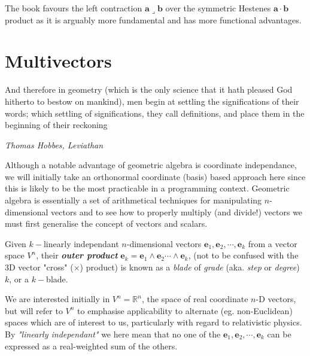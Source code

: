 \documentclass[a4paper]{book}
\numberwithin{equation}{chapter}
\begin{document}
   
\vspace{\baselineskip}

The book favours the left contraction $\mathbf{a}\lrcorner\mathbf{b}$
over the symmetric Hestenes $\mathbf{a}\cdot\mathbf{b}$ product as it is
arguably more fundamental and has more functional advantages.

\section{Multivectors}

\epigraph{And therefore in geometry (which is the only science that it hath pleased God hitherto to bestow on mankind), men begin at settling the significations of their words; which settling of significations, they call definitions, and place them in the beginning of their reckoning}{\textit{Thomas Hobbes, Leviathan  }}

Although a notable advantage of geometric algebra is coordinate independance, we will 
initially take an orthonormal coordinate (basis) based approach here since this is likely 
to be the most practicable in a programming context.
Geometric algebra is essentially a set of arithmetical techniques for manipulating 
$n$-dimensional vectors and to see how to properly multiply (and divide!) vectors we must
first generalise the concept of vectors and scalars.

\vspace{\baselineskip}
 
Given $k-$linearly independant $n$-dimensional vectors 
${\mathbf{e}_1,\mathbf{e}_2, \cdots ,\mathbf{e}_k}$ from a vector 
space $V^n$, 
their \textbf{\emph{outer product}} $\mathbf{e}_k = \mathbf{e}_1
\wedge \mathbf{e}_2 \cdots \wedge \mathbf{e}_k$, (not to be confused 
with the 3D vector "cross" ($\times$) product)  is known as a 
\emph{blade} of \emph{grade} (aka. \emph{step} or \emph{degree}) $k$,
or a $k-$blade. 

\vspace{\baselineskip}

We are interested initially in $V^n=\mathbb{R}^n$, the space of real 
coordinate $n$-D vectors, but will refer to $V^n$ to emphasise 
applicability to alternate (eg. non-Euclidean) spaces which are of 
interest to us, particularly with regard to relativistic physics. By 
\emph{"linearly independant"} we here mean that no one of the 
${\mathbf{e}_1,\mathbf{e}_2, \cdots ,\mathbf{e}_k}$ can be expressed 
as a real-weighted sum of the others.

\vspace{\baselineskip}
\end{document}
